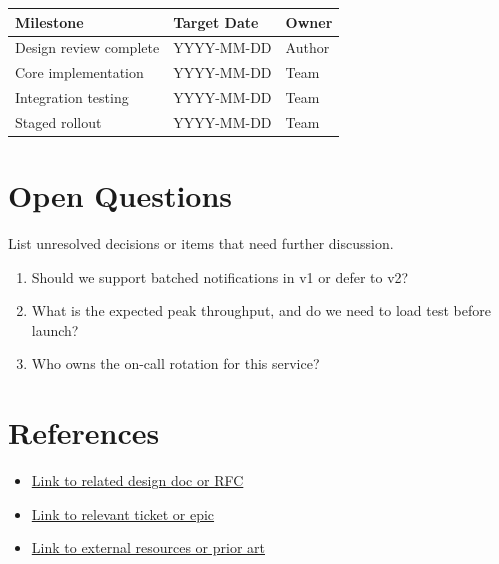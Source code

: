 \documentclass[11pt, a4paper]{article}
\begin{document}
\begin{table}[h]
    \centering
    \begin{tabular}{@{} l l l @{}}
        \toprule
        \textbf{Milestone} & \textbf{Target Date} & \textbf{Owner} \\
        \midrule
        Design review complete    & YYYY-MM-DD & Author \\
        Core implementation       & YYYY-MM-DD & Team \\
        Integration testing       & YYYY-MM-DD & Team \\
        Staged rollout            & YYYY-MM-DD & Team \\
        \bottomrule
    \end{tabular}
\end{table}

\section{Open Questions}

List unresolved decisions or items that need further discussion.

\begin{enumerate}
    \item Should we support batched notifications in v1 or defer to v2?
    \item What is the expected peak throughput, and do we need to load test before launch?
    \item Who owns the on-call rotation for this service?
\end{enumerate}

\section{References}

\begin{itemize}
    \item \href{https://example.com}{Link to related design doc or RFC}
    \item \href{https://example.com}{Link to relevant ticket or epic}
    \item \href{https://example.com}{Link to external resources or prior art}
\end{itemize}
\end{document}
